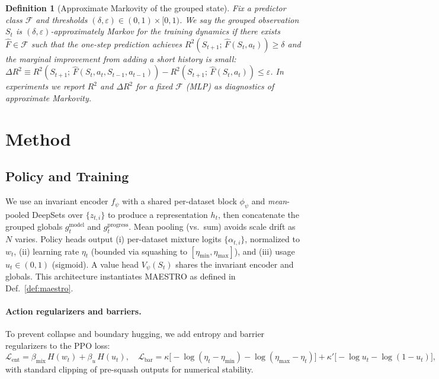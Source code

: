 \documentclass[11pt]{article}
\newtheorem{definition}{Definition}
\newcommand{\1}{\mathbf{1}}
\newcommand{\MAESTRO}{\textsc{MAESTRO}\xspace}
\begin{document}
\begin{definition}[Approximate Markovity of the grouped state]\label{def:approx-markov-tight}
Fix a predictor class $\mathcal F$ and thresholds $(\delta,\varepsilon)\in(0,1)\times[0,1)$. We say the grouped observation $S_t$ is \emph{$(\delta,\varepsilon)$-approximately Markov} for the training dynamics if there exists $\hat F\in\mathcal F$ such that the one-step prediction achieves $R^2\!\left(S_{t+1};\,\hat F(S_t,a_t)\right)\ge \delta$ and the marginal improvement from adding a short history is small: $\Delta R^2 \equiv R^2\!\left(S_{t+1};\,\hat F(S_t,a_t,S_{t-1},a_{t-1})\right)-R^2\!\left(S_{t+1};\,\hat F(S_t,a_t)\right)\le \varepsilon$. In experiments we report $R^2$ and $\Delta R^2$ for a fixed $\mathcal F$ (MLP) as diagnostics of approximate Markovity.
\end{definition}


\section{Method}
\subsection{Policy and Training}
We use an invariant encoder $f_\psi$ with a shared per-dataset block $\phi_\psi$ and \emph{mean}-pooled DeepSets over $\{z_{t,i}\}$ to produce a representation $h_t$, then concatenate the grouped globals $g^{\text{model}}_t$ and $g^{\text{progress}}_t$. Mean pooling (vs.\ sum) avoids scale drift as $N$ varies.
Policy heads output (i) per-dataset mixture logits $\{\alpha_{t,i}\}$, normalized to $w_t$, (ii) learning rate $\eta_t$ (bounded via squashing to $[\eta_{\min},\eta_{\max}]$), and (iii) usage $u_t\in(0,1)$ (sigmoid).
A value head $V_\psi(S_t)$ shares the invariant encoder and globals. This architecture instantiates \MAESTRO{} as defined in Def.~\ref{def:maestro}.

\paragraph{Action regularizers and barriers.}
To prevent collapse and boundary hugging, we add entropy and barrier regularizers to the PPO loss:
\(
\mathcal{L}_{\text{ent}}= \beta_{\text{mix}}\, H(w_t) + \beta_u\, H(u_t),\quad
\mathcal{L}_{\text{bar}}= \kappa\big[-\log(\eta_t-\eta_{\min})-\log(\eta_{\max}-\eta_t)\big] + \kappa'\big[-\log u_t - \log (1-u_t)\big],
\)
with standard clipping of pre-squash outputs for numerical stability.
\end{document}
